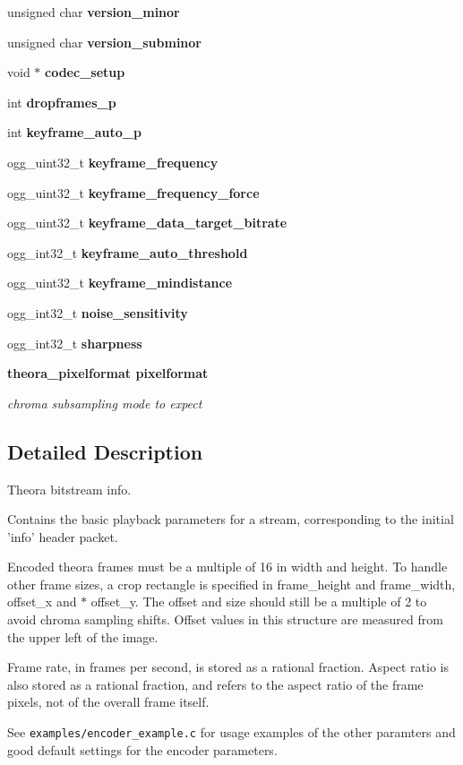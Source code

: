 \begin{CompactItemize}
\item 
unsigned char \bf{version\_\-minor}
\item 
unsigned char \bf{version\_\-subminor}
\item 
void $\ast$ \bf{codec\_\-setup}
\item 
int \bf{dropframes\_\-p}
\item 
int \bf{keyframe\_\-auto\_\-p}
\item 
ogg\_\-uint32\_\-t \bf{keyframe\_\-frequency}
\item 
ogg\_\-uint32\_\-t \bf{keyframe\_\-frequency\_\-force}
\item 
ogg\_\-uint32\_\-t \bf{keyframe\_\-data\_\-target\_\-bitrate}
\item 
ogg\_\-int32\_\-t \bf{keyframe\_\-auto\_\-threshold}
\item 
ogg\_\-uint32\_\-t \bf{keyframe\_\-mindistance}
\item 
ogg\_\-int32\_\-t \bf{noise\_\-sensitivity}
\item 
ogg\_\-int32\_\-t \bf{sharpness}
\item 
\bf{theora\_\-pixelformat} \bf{pixelformat}
\begin{CompactList}\small\item\em chroma subsampling mode to expect \item\end{CompactList}\end{CompactItemize}


\subsection{Detailed Description}
Theora bitstream info. 

Contains the basic playback parameters for a stream, corresponding to the initial 'info' header packet.

Encoded theora frames must be a multiple of 16 in width and height. To handle other frame sizes, a crop rectangle is specified in frame\_\-height and frame\_\-width, offset\_\-x and $\ast$ offset\_\-y. The offset and size should still be a multiple of 2 to avoid chroma sampling shifts. Offset values in this structure are measured from the upper left of the image.

Frame rate, in frames per second, is stored as a rational fraction. Aspect ratio is also stored as a rational fraction, and refers to the aspect ratio of the frame pixels, not of the overall frame itself.

See {\tt examples/encoder\_\-example.c} for usage examples of the other paramters and good default settings for the encoder parameters. 



